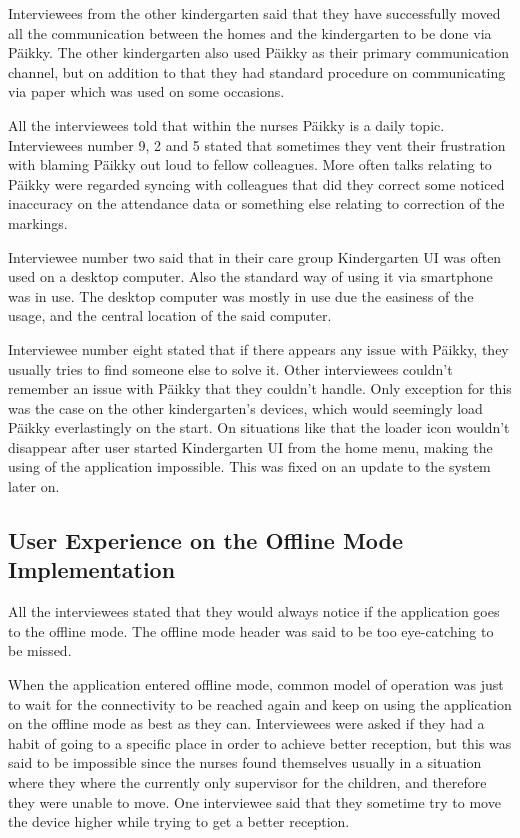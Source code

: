 Interviewees from the other kindergarten said that they have successfully moved all the communication between the homes and the kindergarten to be done via Päikky. The other kindergarten also used Päikky as their primary communication channel, but on addition to that they had standard procedure on communicating via paper which was used on some occasions.

All the interviewees told that within the nurses Päikky is a daily topic. Interviewees number 9, 2 and 5 stated that sometimes they vent their frustration with blaming Päikky out loud to fellow colleagues. More often talks relating to Päikky were regarded syncing with colleagues that did they correct some noticed inaccuracy on the attendance data or something else relating to correction of the markings.

Interviewee number two said that in their care group Kindergarten UI was often used on a desktop computer. Also the standard way of using it via smartphone was in use. The desktop computer was mostly in use due the easiness of the usage, and the central location of the said computer. 

Interviewee number eight stated that if there appears any issue with Päikky, they usually tries to find someone else to solve it. Other interviewees couldn't remember an issue with Päikky that they couldn't handle. Only exception for this was the case on the other kindergarten's devices, which would seemingly load Päikky everlastingly on the start. On situations like that the loader icon wouldn't disappear after user started Kindergarten UI from the home menu, making the using of the application impossible. This was fixed on an update to the system later on.


\subsection{User Experience on the Offline Mode Implementation}

All the interviewees stated that they would always notice if the application goes to the offline mode. The offline mode header was said to be too eye-catching to be missed.

When the application entered offline mode, common model of operation was just to wait for the connectivity to be reached again and keep on using the application on the offline mode as best as they can. Interviewees were asked if they had a habit of going to a specific place in order to achieve better reception, but this was said to be impossible since the nurses found themselves usually in a situation where they where the currently only supervisor for the children, and therefore they were unable to move. One interviewee said that they sometime try to move the device higher while trying to get a better reception.

